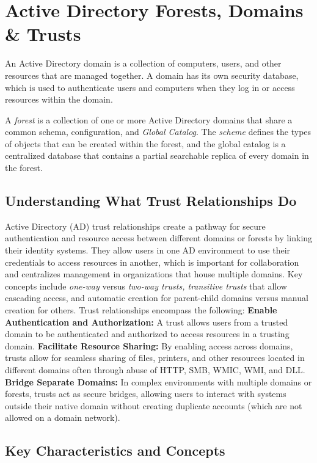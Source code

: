 \section{Active Directory Forests, Domains \& Trusts}
An Active Directory domain \textit{} is a collection of computers, users, and other resources that are managed together. A domain has its own security database, which is used to authenticate users and computers when they log in or access resources within the domain.

A \textit{forest} is a collection of one or more Active Directory domains that share a common schema, configuration, and \textit{Global Catalog}. The \textit{ scheme} defines the types of objects that can be created within the forest, and the global catalog is a centralized database that contains a partial searchable replica of every domain in the forest.

\subsection{Understanding What Trust Relationships Do}
Active Directory (AD) trust relationships create a pathway for secure authentication and resource access between different domains or forests by linking their identity systems. They allow users in one AD environment to use their credentials to access resources in another, which is important for collaboration and centralizes management in organizations that house multiple domains. Key concepts include \textit{one-way} versus \textit{two-way trusts, transitive trusts} that allow cascading access, and automatic creation for parent-child domains versus manual creation for others.
Trust relationships encompass the following:
\textbf{Enable Authentication and Authorization:}
A trust allows users from a trusted domain to be authenticated and authorized to access resources in a trusting domain.
\textbf{Facilitate Resource Sharing:}
By enabling access across domains, trusts allow for seamless sharing of files, printers, and other resources located in different domains often through abuse of HTTP, SMB, WMIC, WMI, and DLL.
\textbf{Bridge Separate Domains:}
In complex environments with multiple domains or forests, trusts act as secure bridges, allowing users to interact with systems outside their native domain without creating duplicate accounts (which are not allowed on a domain network).
\subsection{Key Characteristics and Concepts}

